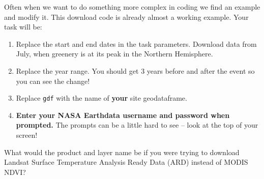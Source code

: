 \documentclass[
  letterpaper,
  DIV=11,
  numbers=noendperiod,
  oneside]{scrreprt}
\providecommand{\tightlist}{%
  \setlength{\itemsep}{0pt}\setlength{\parskip}{0pt}}
\begin{document}
\begin{tcolorbox}[enhanced jigsaw, colbacktitle=quarto-callout-color!10!white, opacityback=0, bottomtitle=1mm, toptitle=1mm, bottomrule=.15mm, left=2mm, colframe=quarto-callout-color-frame, leftrule=.75mm, opacitybacktitle=0.6, colback=white, rightrule=.15mm, toprule=.15mm, breakable, titlerule=0mm, title=\textcolor{quarto-callout-color}{\faInfo}\hspace{0.5em}{Try It}, coltitle=black, arc=.35mm]

Often when we want to do something more complex in coding we find an
example and modify it. This download code is already almost a working
example. Your task will be:

\begin{enumerate}
\def\labelenumi{\arabic{enumi}.}
\tightlist
\item
  Replace the start and end dates in the task parameters. Download data
  from July, when greenery is at its peak in the Northern Hemisphere.
\item
  Replace the year range. You should get 3 years before and after the
  event so you can see the change!
\item
  Replace \texttt{gdf} with the name of \textbf{your} site geodataframe.
\item
  \textbf{Enter your NASA Earthdata username and password when
  prompted.} The prompts can be a little hard to see -- look at the top
  of your screen!
\end{enumerate}

\end{tcolorbox}

\begin{tcolorbox}[enhanced jigsaw, colbacktitle=quarto-callout-color!10!white, opacityback=0, bottomtitle=1mm, toptitle=1mm, bottomrule=.15mm, left=2mm, colframe=quarto-callout-color-frame, leftrule=.75mm, opacitybacktitle=0.6, colback=white, rightrule=.15mm, toprule=.15mm, breakable, titlerule=0mm, title=\textcolor{quarto-callout-color}{\faInfo}\hspace{0.5em}{Reflect and Respond}, coltitle=black, arc=.35mm]

What would the product and layer name be if you were trying to download
Landsat Surface Temperature Analysis Ready Data (ARD) instead of MODIS
NDVI?

\end{tcolorbox}
\end{document}

